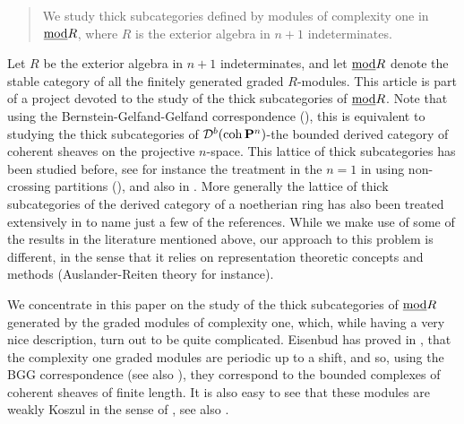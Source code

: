 \documentclass[10pt]{amsart}
\begin{document}
\begin{abstract} 
We study thick subcategories defined by modules of complexity one in $\underline{\operatorname{mod}}R$, where
$R$ is the exterior algebra in $n+1$ indeterminates.
\end{abstract}
\date{\today}
\maketitle



Let $R$ be the exterior algebra in $n+1$ indeterminates, and let $\underline{\operatorname{mod}} R$ denote the stable 
category of all the finitely generated graded $R$-modules. This article is part of a project devoted to 
the study of the thick subcategories of $\underline{\operatorname{mod}} R$. Note that using the Bernstein-Gelfand-Gelfand correspondence (\cite{BGG}), 
this is equivalent to studying the thick subcategories of $\mathcal D^b(\operatorname{coh} {\bf P}^n)$-the bounded derived category of coherent sheaves 
on the projective $n$-space. This lattice of thick subcategories has been studied before, see for instance the treatment in the $n=1$ in \cite{Kr} using non-crossing partitions (\cite{IT}), and also in \cite{GKR}. More generally the lattice of thick subcategories of the derived category of a noetherian ring has also been treated extensively in \cite{BIK, DS, Ho, N, T} to name just a few of the references. While we make use of some of the results in the literature mentioned above, our approach to this problem is different, in the sense that it relies on representation theoretic concepts and methods (Auslander-Reiten theory for instance). 

\medskip
\noindent We concentrate in this paper on the study of the thick subcategories of $\underline{\operatorname{mod}} R$ generated 
by the graded modules of complexity one, which, while having a very nice description, turn out to be quite complicated. Eisenbud 
has proved in \cite{E}, that the complexity one graded modules are periodic up to a shift, and so, using the BGG correspondence (see also \cite{OSS}), they correspond to the bounded complexes of coherent sheaves of finite length. It is also easy to see that these modules 
are weakly Koszul in the sense of \cite{MVZ1}, see also \cite{HI}. 
\end{document}
